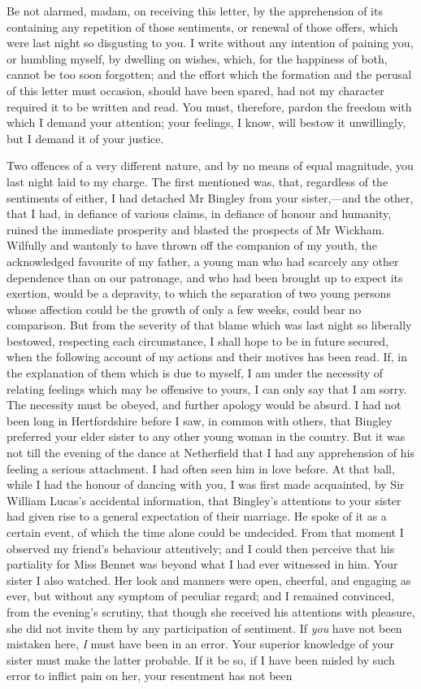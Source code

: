 Be not alarmed, madam, on receiving this letter, by the apprehension of its containing any repetition of those sentiments, or renewal of those offers, which were last night so disgusting to you. I write without any intention of paining you, or humbling myself, by dwelling on wishes, which, for the happiness of both, cannot be too soon forgotten; and the effort which the formation and the perusal of this letter must occasion, should have been spared, had not my character required it to be written and read. You must, therefore, pardon the freedom with which I demand your attention; your feelings, I know, will bestow it unwillingly, but I demand it of your justice.

Two offences of a very different nature, and by no means of equal magnitude, you last night laid to my charge. The first mentioned was, that, regardless of the sentiments of either, I had detached Mr Bingley from your sister,—and the other, that I had, in defiance of various claims, in defiance of honour and humanity, ruined the immediate prosperity and blasted the prospects of Mr Wickham. Wilfully and wantonly to have thrown off the companion of my youth, the acknowledged favourite of my father, a young man who had scarcely any other dependence than on our patronage, and who had been brought up to expect its exertion, would be a depravity, to which the separation of two young persons whose affection could be the growth of only a few weeks, could bear no comparison. But from the severity of that blame which was last night so liberally bestowed, respecting each circumstance, I shall hope to be in future secured, when the following account of my actions and their motives has been read. If, in the explanation of them which is due to myself, I am under the necessity of relating feelings which may be offensive to yours, I can only say that I am sorry. The necessity must be obeyed, and further apology would be absurd. I had not been long in Hertfordshire before I saw, in common with others, that Bingley preferred your elder sister to any other young woman in the country. But it was not till the evening of the dance at Netherfield that I had any apprehension of his feeling a serious attachment. I had often seen him in love before. At that ball, while I had the honour of dancing with you, I was first made acquainted, by Sir William Lucas's accidental information, that Bingley's attentions to your sister had given rise to a general expectation of their marriage. He spoke of it as a certain event, of which the time alone could be undecided. From that moment I observed my friend's behaviour attentively; and I could then perceive that his partiality for Miss Bennet was beyond what I had ever witnessed in him. Your sister I also watched. Her look and manners were open, cheerful, and engaging as ever, but without any symptom of peculiar regard; and I remained convinced, from the evening's scrutiny, that though she received his attentions with pleasure, she did not invite them by any participation of sentiment. If \textit{you} have not been mistaken here, \textit{I} must have been in an error. Your superior knowledge of your sister must make the latter probable. If it be so, if I have been misled by such error to inflict pain on her, your resentment has not been 